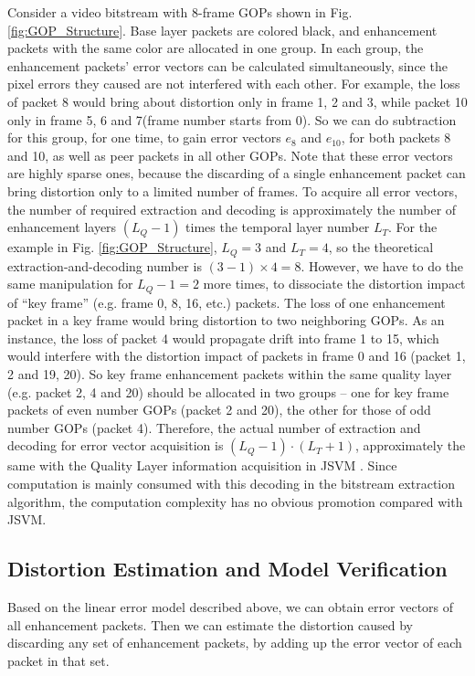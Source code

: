 \documentclass[journal]{IEEEtran}
\begin{document}
Consider a video bitstream with 8-frame GOPs shown in Fig. \ref{fig:GOP_Structure}. Base layer packets are colored black, and enhancement packets with the same color are allocated in one group. In each group, the enhancement packets' error vectors can be calculated simultaneously, since the pixel errors they caused are not interfered with each other. For example, the loss of packet 8 would bring about distortion only in frame 1, 2 and 3, while packet 10 only in frame 5, 6 and 7(frame number starts from 0). So we can do subtraction for this group, for one time, to gain error vectors $e_{8}$ and $e_{10}$, for both packets 8 and 10, as well as peer packets in all other GOPs. Note that these error vectors are highly sparse ones, because the discarding of a single enhancement packet can bring distortion only to a limited number of frames. To acquire all error vectors, the number of required extraction and decoding is approximately the number of enhancement layers $(L_Q - 1)$ times the temporal layer number $L_T$. For the example in Fig. \ref{fig:GOP_Structure}, $L_Q = 3$ and $L_T = 4$, so the theoretical extraction-and-decoding number is $(3 - 1) \times 4 = 8$. However, we have to do the same manipulation for $L_Q - 1 = 2$ more times, to dissociate the distortion impact of ``key frame'' \cite{H264Overview} (e.g. frame 0, 8, 16, etc.) packets. The loss of one enhancement packet in a key frame would bring distortion to two neighboring GOPs. As an instance, the loss of packet 4 would propagate drift into frame 1 to 15, which would interfere with the distortion impact of packets in frame 0 and 16 (packet 1, 2 and 19, 20). So key frame enhancement packets within the same quality layer (e.g. packet 2, 4 and 20) should be allocated in two groups -- one for key frame packets of even number GOPs (packet 2 and 20), the other for those of odd number GOPs (packet 4). Therefore, the actual number of extraction and decoding for error vector acquisition is $(L_Q - 1) \cdot (L_T + 1)$, approximately the same with the Quality Layer information acquisition in JSVM \cite{Amonou07}. Since computation is mainly consumed with this decoding in the bitstream extraction algorithm, the computation complexity has no obvious promotion compared with JSVM.
 
\subsection{Distortion Estimation and Model Verification}

Based on the linear error model described above, we can obtain error vectors of all enhancement packets. Then we can estimate the distortion caused by discarding any set of enhancement packets, by adding up the error vector of each packet in that set.
\end{document}
